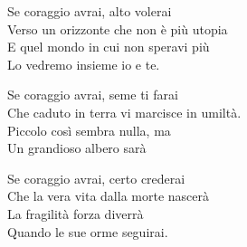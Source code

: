

\spazio

\strofa Se coraggio avrai, alto volerai\\
Verso un orizzonte che non è più utopia\\
E quel mondo in cui non speravi più\\
Lo vedremo insieme io e te.

\spazio


\spazio

\strofa Se coraggio avrai, seme ti farai\\
Che caduto in terra vi marcisce in umiltà.\\
Piccolo così sembra nulla, ma\\
Un grandioso albero sarà

\spazio


\spazio

\strofa Se coraggio avrai, certo crederai\\
Che la vera vita dalla morte nascerà\\
La fragilità forza diverrà\\
Quando le sue orme seguirai.

\spazio

